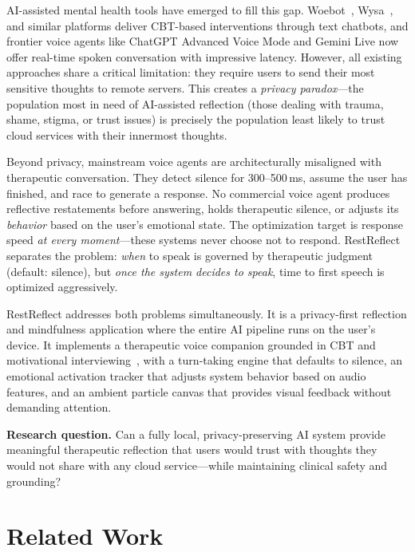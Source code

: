 \documentclass{article}
\begin{document}
AI-assisted mental health tools have emerged to fill this gap. Woebot~\citep{fitzpatrick2017woebot}, Wysa~\citep{inkster2018wysa}, and similar platforms deliver CBT-based interventions through text chatbots, and frontier voice agents like ChatGPT Advanced Voice Mode and Gemini Live now offer real-time spoken conversation with impressive latency. However, all existing approaches share a critical limitation: they require users to send their most sensitive thoughts to remote servers. This creates a \emph{privacy paradox}---the population most in need of AI-assisted reflection (those dealing with trauma, shame, stigma, or trust issues) is precisely the population least likely to trust cloud services with their innermost thoughts.

Beyond privacy, mainstream voice agents are architecturally misaligned with therapeutic conversation. They detect silence for 300--500\,ms, assume the user has finished, and race to generate a response. No commercial voice agent produces reflective restatements before answering, holds therapeutic silence, or adjusts its \emph{behavior} based on the user's emotional state. The optimization target is response speed \emph{at every moment}---these systems never choose not to respond. RestReflect separates the problem: \emph{when} to speak is governed by therapeutic judgment (default: silence), but \emph{once the system decides to speak}, time to first speech is optimized aggressively.

RestReflect addresses both problems simultaneously. It is a privacy-first reflection and mindfulness application where the entire AI pipeline runs on the user's device. It implements a therapeutic voice companion grounded in CBT and motivational interviewing~\citep{miller2013motivational}, with a turn-taking engine that defaults to silence, an emotional activation tracker that adjusts system behavior based on audio features, and an ambient particle canvas that provides visual feedback without demanding attention.

\textbf{Research question.} Can a fully local, privacy-preserving AI system provide meaningful therapeutic reflection that users would trust with thoughts they would not share with any cloud service---while maintaining clinical safety and grounding?

\section{Related Work}
\end{document}
